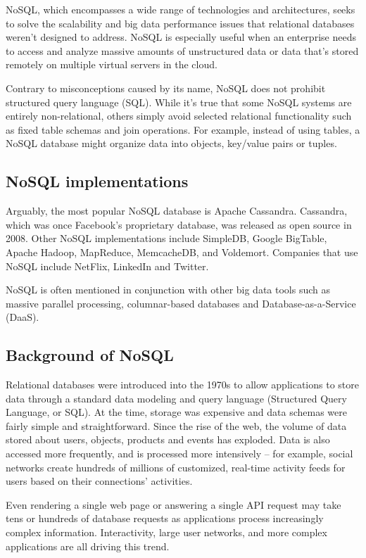 \documentclass[12pt]{article}
\begin{document}
NoSQL, which encompasses a wide range of technologies and architectures, seeks to solve the scalability and big data performance issues that relational databases weren’t designed to address. NoSQL is especially useful when an enterprise needs to access and analyze massive amounts of unstructured data or data that's stored remotely on multiple virtual servers in the cloud.   

Contrary to misconceptions caused by its name, NoSQL does not prohibit structured query language (SQL). While it's true that some NoSQL systems are entirely non-relational, others simply avoid selected relational functionality such as fixed table schemas and join operations. For example, instead of using tables, a NoSQL database might organize data into objects, key/value pairs or tuples.

\subsection{NoSQL implementations}
Arguably, the most popular NoSQL database is Apache Cassandra. Cassandra, which was once Facebook’s proprietary database, was released as open source in 2008. Other NoSQL implementations include SimpleDB, Google BigTable, Apache Hadoop, MapReduce, MemcacheDB, and Voldemort. Companies that use NoSQL include NetFlix, LinkedIn and Twitter.

NoSQL is often mentioned in conjunction with other big data tools such as massive parallel processing, columnar-based databases and Database-as-a-Service (DaaS).

\subsection{Background of NoSQL}
Relational databases were introduced into the 1970s to allow applications to store data through a standard data modeling and query language (Structured Query Language, or SQL). At the time, storage was expensive and data schemas were fairly simple and straightforward. Since the rise of the web, the volume of data stored about users, objects, products and events has exploded. Data is also accessed more frequently, and is processed more intensively – for example, social networks create hundreds of millions of customized, real-time activity feeds for users based on their connections' activities.

Even rendering a single web page or answering a single API request may take tens or hundreds of database requests as applications process increasingly complex information. Interactivity, large user networks, and more complex applications are all driving this trend.
\end{document}
